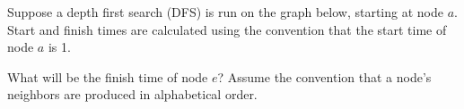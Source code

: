 \Needspace{3.5in}
\begin{prob}

    Suppose a depth first search (DFS) is run on the graph below, starting at node $a$.
    Start and finish times are calculated using the convention that the start time of node $a$ is 1.

    \grapha

    What will be the finish time of node $e$? Assume the convention that a
    node's neighbors are produced in alphabetical order.


\end{prob}
